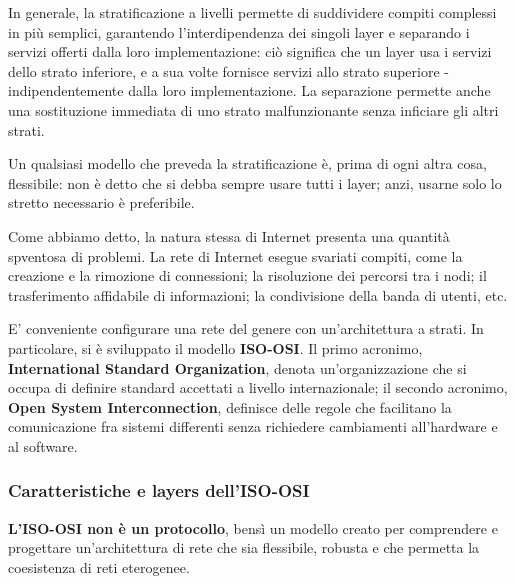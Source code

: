     \vspace{3mm}
    
    In generale, la stratificazione a livelli permette di suddividere compiti complessi in più semplici, garantendo l'interdipendenza dei singoli layer e separando i servizi offerti dalla loro implementazione: ciò significa che un layer usa i servizi dello strato inferiore, e a sua volte fornisce servizi allo strato superiore - indipendentemente dalla loro implementazione. La separazione permette anche una sostituzione immediata di uno strato malfunzionante senza inficiare gli altri strati.
    
    \vspace{3mm}
    
    Un qualsiasi modello che preveda la stratificazione è, prima di ogni altra cosa, flessibile: non è detto che si debba sempre usare tutti i layer; anzi, usarne solo lo stretto necessario è preferibile.
    
    \vspace{3mm}
    
    Come abbiamo detto, la natura stessa di Internet presenta una quantità spventosa di problemi. La rete di Internet esegue svariati compiti, come la creazione e la rimozione di connessioni; la risoluzione dei percorsi tra i nodi; il trasferimento affidabile di informazioni; la condivisione della banda di utenti, etc.
    
    \vspace{3mm}
    
    E' conveniente configurare una rete del genere con un'architettura a strati. In particolare, si è sviluppato il modello \textbf{ISO-OSI}. Il primo acronimo, \textbf{International Standard Organization}, denota un'organizzazione che si occupa di definire standard accettati a livello internazionale; il secondo acronimo, \textbf{Open System Interconnection}, definisce delle regole che facilitano la comunicazione fra sistemi differenti senza richiedere cambiamenti all'hardware e al software.
    
    \subsubsection{Caratteristiche e layers dell'ISO-OSI}
    
        \textbf{L'ISO-OSI non è un protocollo}, bensì un modello creato per comprendere e progettare un'architettura di rete che sia flessibile, robusta e che permetta la coesistenza di reti eterogenee.
        
